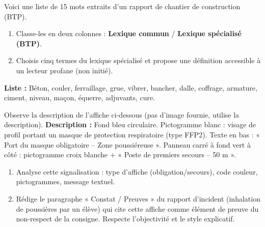 \documentclass[11pt]{article}
\newcounter{popsec}
\newcounter{popsub}
\newcommand{\courssub}[1]{%
  \stepcounter{popsub}%
  \par\vspace{9pt}\noindent{\popxbold\fontsize{11.5}{13}\selectfont\color{popink}{\color{poporange}\thepopsec.\thepopsub}\hspace{6pt}#1}\par\nopagebreak\vspace{4pt}
}
\begin{document}
\begin{exercice}
Voici une liste de 15 mots extraits d'un rapport de chantier de construction (BTP). 
\begin{enumerate}
    \item Classe-les en deux colonnes : \textbf{Lexique commun} / \textbf{Lexique spécialisé (BTP)}.
    \item Choisis cinq termes du lexique spécialisé et propose une définition accessible à un lecteur profane (non initié).
\end{enumerate}
\textbf{Liste :} Béton, couler, ferraillage, grue, vibrer, bancher, dalle, coffrage, armature, ciment, niveau, maçon, équerre, adjuvants, cure.
\end{exercice}

\begin{exercice}
Observe la description de l'affiche ci-dessous (pas d'image fournie, utilise la description).
\textbf{Description :} Fond bleu circulaire. Pictogramme blanc : visage de profil portant un masque de protection respiratoire (type FFP2). Texte en bas : « Port du masque obligatoire – Zone poussiéreuse ». Panneau carré à fond vert à côté : pictogramme croix blanche + « Poste de premiers secours – 50 m ».
\begin{enumerate}
    \item Analyse cette signalisation : type d'affiche (obligation/secours), code couleur, pictogrammes, message textuel.
    \item Rédige le paragraphe « Constat / Preuves » du rapport d'incident (inhalation de poussières par un élève) qui cite cette affiche comme élément de preuve du non-respect de la consigne. Respecte l'objectivité et le style explicatif.
\end{enumerate}
\end{exercice}

\courssub{Je me prépare au Bac}
\end{document}
